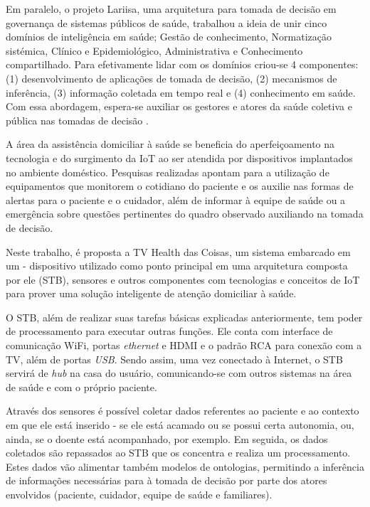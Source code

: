 Em paralelo, o projeto Lariisa, uma arquitetura para tomada de decisão em governança
de sistemas públicos de saúde, trabalhou a ideia de unir cinco domínios de inteligência
em saúde; Gestão de conhecimento, Normatização sistémica, Clínico e Epidemiológico,
Administrativa e Conhecimento compartilhado. Para efetivamente lidar com os domínios
criou-se 4 componentes: (1) desenvolvimento de aplicações de tomada de decisão, (2) 
mecanismos de inferência, (3) informação coletada em tempo real e (4) conhecimento em 
saúde. Com essa abordagem, espera-se auxiliar os gestores e atores da saúde coletiva 
e pública nas tomadas de decisão \cite{oliveira2010context}.

A área da assistência domiciliar à saúde se beneficia do aperfeiçoamento na
tecnologia e do surgimento da IoT ao ser atendida por dispositivos implantados
no ambiente doméstico.  Pesquisas realizadas \cite{triantafyllidis2013,moreira2016} 
apontam para a utilização de equipamentos que monitorem o cotidiano do paciente
e os auxilie nas formas de alertas para o paciente e o cuidador, além de
informar à equipe de saúde ou a emergência sobre questões pertinentes do quadro 
observado auxiliando na tomada de decisão.

Neste trabalho, é proposta a TV Health das Coisas, um sistema embarcado em um
\stb[] - dispositivo utilizado como ponto principal em uma arquitetura composta
por ele (STB), sensores e outros componentes com tecnologias e conceitos de IoT
para  prover uma solução inteligente de atenção domiciliar à saúde.

O STB, além de realizar suas tarefas básicas explicadas anteriormente, tem poder
de processamento para executar outras funções. Ele conta com interface de
comunicação WiFi, portas \textit{ethernet} e HDMI e o padrão RCA para
conexão com a TV, além de portas \textit{USB}. Sendo assim, uma vez conectado à
Internet, o STB servirá de \textit{hub} na casa do usuário, comunicando-se
com outros sistemas na área de saúde e com o próprio paciente.

Através dos sensores é possível coletar dados referentes ao paciente e ao
contexto em que ele está inserido - se ele está acamado ou se
possui certa autonomia, ou, ainda, se o doente está acompanhado, por exemplo.  Em seguida, os
dados coletados são repassados ao STB que  os concentra e realiza um
processamento. Estes dados vão alimentar também modelos de ontologias, 
permitindo a inferência de informações necessárias para à tomada de decisão
por parte dos atores  envolvidos (paciente, cuidador, equipe de saúde e 
familiares). 


